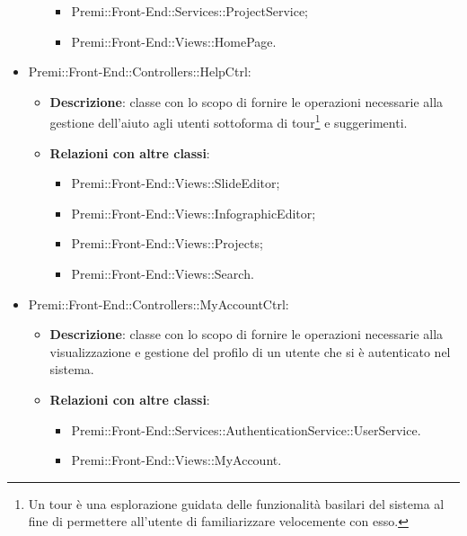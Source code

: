 \begin{itemize}
\begin{itemize}
		\begin{itemize}
			\item Premi::Front-End::Services::ProjectService;
			\item Premi::Front-End::Views::HomePage.
		\end{itemize}
	\end{itemize}
	\item  Premi::Front-End::Controllers::HelpCtrl:
	\begin{itemize}
		\item \textbf{Descrizione}: 
			classe con lo scopo di fornire le operazioni necessarie alla gestione dell'aiuto agli utenti sottoforma di tour\footnote{Un tour è una esplorazione guidata delle funzionalità basilari del sistema al fine di permettere all'utente di familiarizzare velocemente con esso.} e suggerimenti.
		\item \textbf{Relazioni con altre classi}:
			\begin{itemize}
				\item Premi::Front-End::Views::SlideEditor;
				\item Premi::Front-End::Views::InfographicEditor;
				\item Premi::Front-End::Views::Projects;
				\item Premi::Front-End::Views::Search.
			\end{itemize}
			
	\end{itemize}
	\item  Premi::Front-End::Controllers::MyAccountCtrl:
		\begin{itemize}
			\item \textbf{Descrizione}: 
				classe con lo scopo di fornire le operazioni necessarie alla visualizzazione e gestione del profilo di un utente che si è autenticato nel sistema.
			\item \textbf{Relazioni con altre classi}:	
			\begin{itemize}
				\item Premi::Front-End::Services::AuthenticationService::UserService.
				\item Premi::Front-End::Views::MyAccount.
			\end{itemize}
		\end{itemize}
\end{itemize}
\newpage
